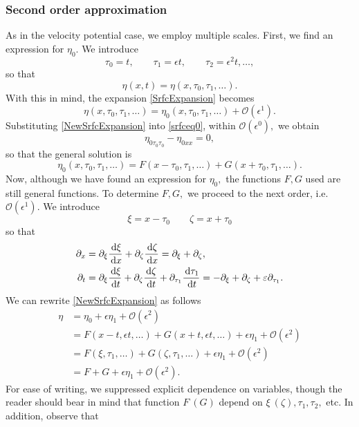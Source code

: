 \documentclass[10pt,reqno,oneside,a4paper]{article}
\begin{document}
\subsubsection*{Second order approximation}
As in the velocity potential case, we employ multiple scales. First, we find an expression for $\eta_0.$  We introduce 
\[ \tau_0 = t, \qquad \tau_1 = \epsilon t, \qquad \tau_2 = \epsilon^2 t, \ldots, \]
so that 
\[ \eta(x, t) = \eta(x, \tau_0, \tau_1, \ldots). \]
With this in mind, the expansion \eqref{SrfcExpansion} becomes
\begin{equation}\label{NewSrfcExpansion}
\eta(x, \tau_0, \tau_1, \ldots) = \eta_0(x, \tau_0, \tau_1, \ldots) + \mathcal{O}(\epsilon^1).
\end{equation}
Substituting \eqref{NewSrfcExpansion} into \eqref{srfceq0}, within $\mathcal{O}(\epsilon^0),$ we obtain
\begin{equation}\label{1stOrderApprox}
\eta_{0\tau_0 \tau_0} - \eta_{0xx} = 0,
\end{equation}
so that the general solution is 
\[ \eta_0(x, \tau_0, \tau_1, \ldots ) = F(x-\tau_0, \tau_1, \ldots ) + G(x+\tau_0, \tau_1, \ldots). \]
Now, although we have found an expression for $\eta_0,$ the functions $F,G$ used are still general functions. To determine $F,G,$ we proceed to the next order, i.e. $\mathcal{O}(\epsilon^1).$ We introduce
\[ 
\xi = x-\tau_0 \qquad \zeta = x+ \tau_0
\]
so that 
\begin{align*}
\partial_x &= \partial_\xi \frac{\,\mathrm{d} \xi}{\,\mathrm{d} x} + \partial_\zeta \frac{\,\mathrm{d} \zeta}{\,\mathrm{d} x} =\partial_\xi + \partial_\zeta, \\
\partial_t &= \partial_\xi \frac{\,\mathrm{d} \xi}{\,\mathrm{d} t} + \partial_\zeta \frac{\,\mathrm{d} \zeta}{\,\mathrm{d} t} + \partial_{\tau_1}\frac{\,\mathrm{d} \tau_1}{\,\mathrm{d} t} = - \partial_\xi + \partial_\zeta + \varepsilon \partial_{\tau_1}.
\end{align*}
We can rewrite \eqref{NewSrfcExpansion} as follows
\begin{align*}
\eta &= \eta_0 + \epsilon \eta_1 + \mathcal{O}(\epsilon^2)  \\
&= F(x-t, \epsilon t, \ldots) + G(x+t, \epsilon t, \ldots) + \epsilon \eta_1 + \mathcal{O}(\epsilon^2) \\
&= F(\xi, \tau_1, \ldots) + G(\zeta, \tau_1, \ldots) + \epsilon \eta_1 + \mathcal{O}(\epsilon^2) \\
&= F+G + \epsilon \eta_1 +  \mathcal{O}(\epsilon^2).
\end{align*}
For ease of writing, we suppressed explicit dependence on variables, though the reader should bear in mind that function $F ~ (G)$ depend on $\xi ~ (\zeta), \tau_1, \tau_2,$ etc. In addition, observe that
\end{document}
